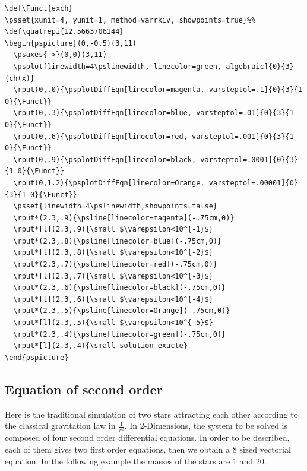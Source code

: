 \documentclass[11pt,english,BCOR=10mm,DIV=12,bibliography=totoc,parskip=false,headings=small,
    headinclude=false,footinclude=false,oneside]{pst-doc}
\begin{document}
\begin{lstlisting}[wide=true]
\def\Funct{exch}
\psset{xunit=4, yunit=1, method=varrkiv, showpoints=true}%%
\def\quatrepi{12.5663706144}
\begin{pspicture}(0,-0.5)(3,11)
  \psaxes{->}(0,0)(3,11)
  \psplot[linewidth=4\pslinewidth, linecolor=green, algebraic]{0}{3}{ch(x)}
  \rput(0,.0){\psplotDiffEqn[linecolor=magenta, varsteptol=.1]{0}{3}{1 0}{\Funct}}
  \rput(0,.3){\psplotDiffEqn[linecolor=blue, varsteptol=.01]{0}{3}{1 0}{\Funct}}
  \rput(0,.6){\psplotDiffEqn[linecolor=red, varsteptol=.001]{0}{3}{1 0}{\Funct}}
  \rput(0,.9){\psplotDiffEqn[linecolor=black, varsteptol=.0001]{0}{3}{1 0}{\Funct}}
  \rput(0,1.2){\psplotDiffEqn[linecolor=Orange, varsteptol=.00001]{0}{3}{1 0}{\Funct}}
  \psset{linewidth=4\pslinewidth,showpoints=false}
  \rput*(2.3,.9){\psline[linecolor=magenta](-.75cm,0)}
  \rput*[l](2.3,.9){\small $\varepsilon<10^{-1}$}
  \rput*(2.3,.8){\psline[linecolor=blue](-.75cm,0)}
  \rput*[l](2.3,.8){\small $\varepsilon<10^{-2}$}
  \rput*(2.3,.7){\psline[linecolor=red](-.75cm,0)}
  \rput*[l](2.3,.7){\small $\varepsilon<10^{-3}$}
  \rput*(2.3,.6){\psline[linecolor=black](-.75cm,0)}
  \rput*[l](2.3,.6){\small $\varepsilon<10^{-4}$}
  \rput*(2.3,.5){\psline[linecolor=Orange](-.75cm,0)}
  \rput*[l](2.3,.5){\small $\varepsilon<10^{-5}$}
  \rput*(2.3,.4){\psline[linecolor=green](-.75cm,0)}
  \rput*[l](2.3,.4){\small solution exacte}
\end{pspicture}
\end{lstlisting}




\clearpage
\subsection{Equation of second order}

Here is the traditional simulation of two stars attracting each
other according to the classical gravitation law in
$\displaystyle\frac{1}{r^2}$. In 2-Dimensions, the system to be
solved is composed of four second order differential equations. In
order to be described, each of them gives two first order
equations, then we obtain a 8 sized vectorial equation. In the
following example the masses of the stars are 1 and 20.
\end{document}
